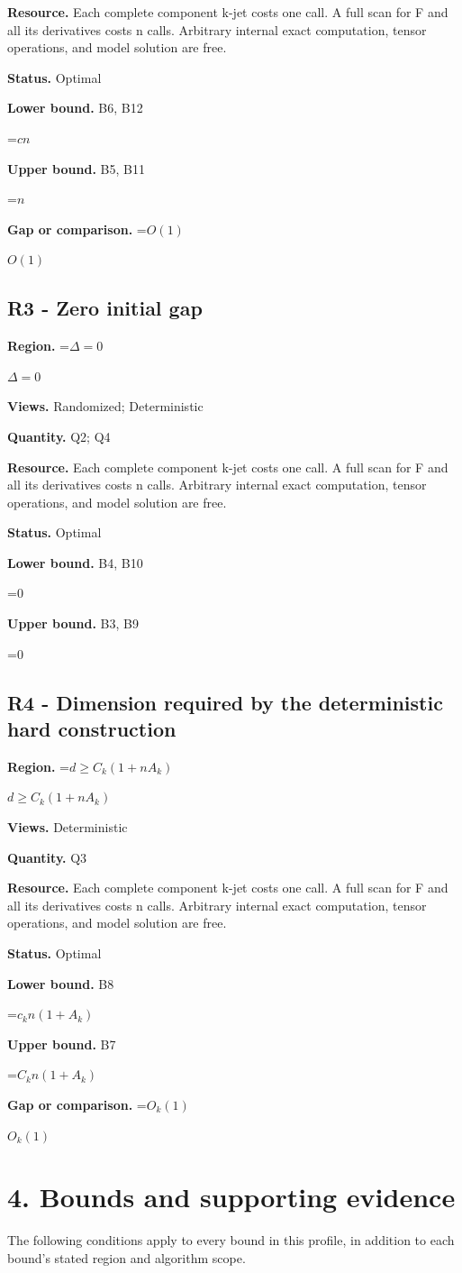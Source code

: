 \documentclass[10pt,a4paper]{article}
\newcommand{\AtlasMath}[1]{\par\begingroup\centering\setbox0=\hbox{$\displaystyle #1$}\ifdim\wd0>1.4\linewidth\typeout{ATLAS WIDE FORMULA: \the\wd0}\fi\ifdim\wd0>\linewidth\resizebox{\linewidth}{!}{\box0}\else\box0\fi\par\endgroup}
\newcommand{\AtlasInlineMath}[1]{\begingroup\setbox0=\hbox{$#1$}\ifdim\wd0>.4\linewidth\endgroup\AtlasMath{#1}\else\endgroup$#1$\fi}
\begin{document}
\textbf{Resource.} Each complete component k-jet costs one call. A full scan for F and all its derivatives costs n calls. Arbitrary internal exact computation, tensor operations, and model solution are free.

\textbf{Status.} Optimal

\textbf{Lower bound.} B6, B12

\AtlasMath{cn}
\textbf{Upper bound.} B5, B11

\AtlasMath{n}
\textbf{Gap or comparison.} \AtlasInlineMath{O(1)}

\subsection{R3 - Zero initial gap}
\textbf{Region.} \AtlasInlineMath{\Delta=0}

\textbf{Views.} Randomized; Deterministic

\textbf{Quantity.} Q2; Q4

\textbf{Resource.} Each complete component k-jet costs one call. A full scan for F and all its derivatives costs n calls. Arbitrary internal exact computation, tensor operations, and model solution are free.

\textbf{Status.} Optimal

\textbf{Lower bound.} B4, B10

\AtlasMath{0}
\textbf{Upper bound.} B3, B9

\AtlasMath{0}
\subsection{R4 - Dimension required by the deterministic hard construction}
\textbf{Region.} \AtlasInlineMath{d\ge C_k(1+nA_k)}

\textbf{Views.} Deterministic

\textbf{Quantity.} Q3

\textbf{Resource.} Each complete component k-jet costs one call. A full scan for F and all its derivatives costs n calls. Arbitrary internal exact computation, tensor operations, and model solution are free.

\textbf{Status.} Optimal

\textbf{Lower bound.} B8

\AtlasMath{c_kn(1+A_k)}
\textbf{Upper bound.} B7

\AtlasMath{C_kn(1+A_k)}
\textbf{Gap or comparison.} \AtlasInlineMath{O_k(1)}

\section{4. Bounds and supporting evidence}
The following conditions apply to every bound in this profile, in addition to each bound's stated region and algorithm scope.
\end{document}
